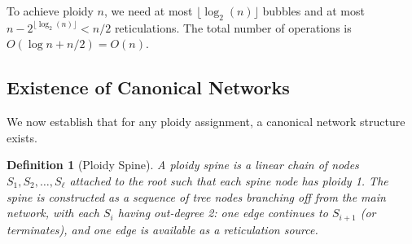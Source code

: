 \documentclass{article}
\newtheorem{definition}{\color{bluem}Definition}
\begin{document}
\begin{remark}
To achieve ploidy $n$, we need at most $\lfloor \log_2(n) \rfloor$ bubbles and at most $n - 2^{\lfloor \log_2(n) \rfloor} < n/2$ reticulations. The total number of operations is $O(\log n + n/2) = O(n)$.
\end{remark}

\subsection{Existence of Canonical Networks}

We now establish that for any ploidy assignment, a canonical network structure exists.

\begin{definition}[Ploidy Spine]
A \textit{ploidy spine} is a linear chain of nodes $S_1, S_2, \ldots, S_\ell$ attached to the root such that each spine node has ploidy 1. The spine is constructed as a sequence of tree nodes branching off from the main network, with each $S_i$ having out-degree 2: one edge continues to $S_{i+1}$ (or terminates), and one edge is available as a reticulation source.
\end{definition}
\end{document}
